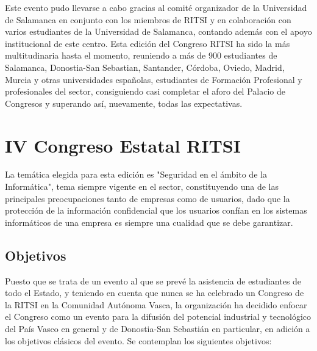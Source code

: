 \documentclass[11pt]{ritsi/article}
\begin{document}
Este evento pudo llevarse a cabo gracias al comité organizador de la Universidad de Salamanca en conjunto con los miembros de RITSI y en colaboración con varios estudiantes de la Universidad de Salamanca, contando además con el apoyo institucional de este centro. Esta edición del Congreso RITSI ha sido la más multitudinaria hasta el momento, reuniendo a más de 900 estudiantes de Salamanca, Donostia-San Sebastian, Santander, Córdoba, Oviedo, Madrid, Murcia y otras universidades españolas, estudiantes de Formación Profesional y profesionales del sector, consiguiendo casi completar el aforo del Palacio de Congresos y superando así, nuevamente, todas las expectativas.

\section{IV Congreso Estatal RITSI}

La temática elegida para esta edición es "Seguridad en el ámbito de la Informática", tema siempre vigente en el sector, constituyendo una de las principales preocupaciones tanto de empresas como de usuarios, dado que la protección de la información confidencial que los usuarios confían en los sistemas informáticos de una empresa es siempre una cualidad que se debe garantizar.
 
\subsection{Objetivos}
Puesto que se trata de un evento al que se prevé la asistencia de estudiantes de todo el Estado, y teniendo en cuenta que nunca se ha celebrado un Congreso de la RITSI en la Comunidad Autónoma Vasca, la organización ha decidido enfocar el Congreso como un evento para la difusión del potencial industrial y tecnológico del País Vasco en general y de Donostia-San Sebastián en particular, en adición a los objetivos clásicos del evento. Se contemplan los siguientes objetivos:
\end{document}
